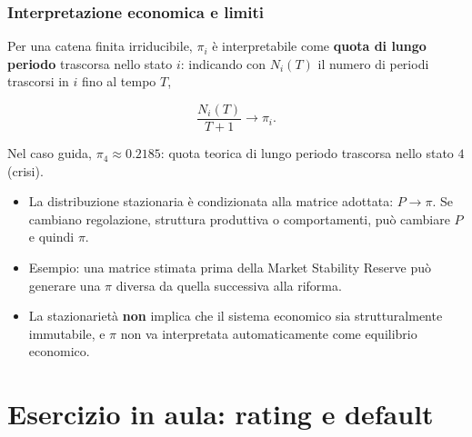 \documentclass[handout]{beamer}%
\newenvironment{stepitemize}{\begin{itemize}[<+->]}{\end{itemize} }
\providecommand{\QTR}[2]{\csname #1\endcsname{#2}}
\begin{document}
\begin{frame}%
%

\frametitle{Interpretazione economica e limiti}%
%

%


Per una catena finita irriducibile, $\pi_{i}$ \`{e} interpretabile come
\textbf{quota di lungo periodo} trascorsa nello stato $i$: indicando con
$N_{i}(T)$ il numero di periodi trascorsi in $i$ fino al tempo $T$,%

\[
\frac{N_{i}(T)}{T+1} \longrightarrow\pi_{i}.
\]


Nel caso guida, $\pi_{4}\approx0.2185$: quota teorica di lungo periodo
trascorsa nello stato $4$ (crisi).

\medskip

\begin{stepitemize}
\item La distribuzione stazionaria \`{e} condizionata alla matrice adottata:
$P\longrightarrow\pi$. Se cambiano regolazione, struttura produttiva o
comportamenti, pu\`{o} cambiare $P$ e quindi $\pi$.

\item Esempio: una matrice stimata prima della Market Stability Reserve
pu\`{o} generare una $\pi$ diversa da quella successiva alla riforma.

\item La stazionariet\`{a} \textbf{non} implica che il sistema economico sia
strutturalmente immutabile, e $\pi$ non va interpretata automaticamente come
equilibrio economico.
\end{stepitemize}%

\transboxout
\end{frame}%




\section{Esercizio in aula: rating e default}
\end{document}
